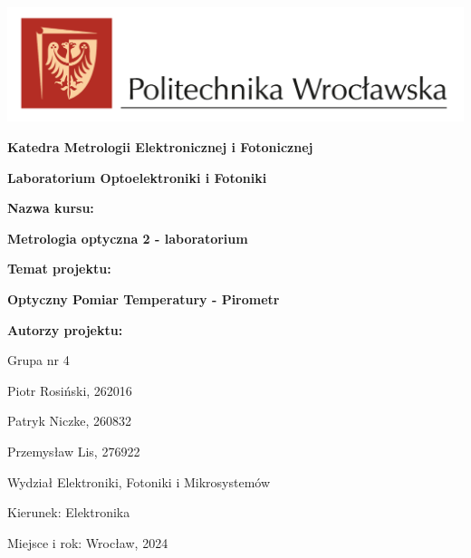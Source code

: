 \begin{titlepage}
    \centering
    \includegraphics[width=1\textwidth]{images/logo PWr kolor poziom}\par
    {\Large\bfseries Katedra Metrologii Elektronicznej i Fotonicznej\par}
    \vspace{0.25cm}
    {\Large\bfseries Laboratorium Optoelektroniki i Fotoniki\par}
    \vspace{1.75cm}
    {\large\bfseries Nazwa kursu:\par}
    {\Large\bfseries Metrologia optyczna 2 - laboratorium\par}
    \vspace{1.75cm}
    {\Large\bfseries Temat projektu:\par}
    {\huge\bfseries Optyczny Pomiar Temperatury - Pirometr\par}
    \vspace{1.25cm}
    {\Large\bfseries Autorzy projektu:\par}
    \vspace{0.25cm}

    {\large Grupa nr 4 \par}

    \vspace{0.25cm}

    {\large Piotr Rosiński, 262016 \par}
    {\large Patryk Niczke, 260832 \par}
    {\large Przemysław Lis, 276922 \par}
    \vspace{1.5cm}
    {\large Wydział Elektroniki, Fotoniki i Mikrosystemów\par}
    {\large Kierunek: Elektronika\par}
    \vspace{1cm}
    {\large Miejsce i rok: Wrocław, 2024\par}
    \vspace*{\fill}
    \end{titlepage}